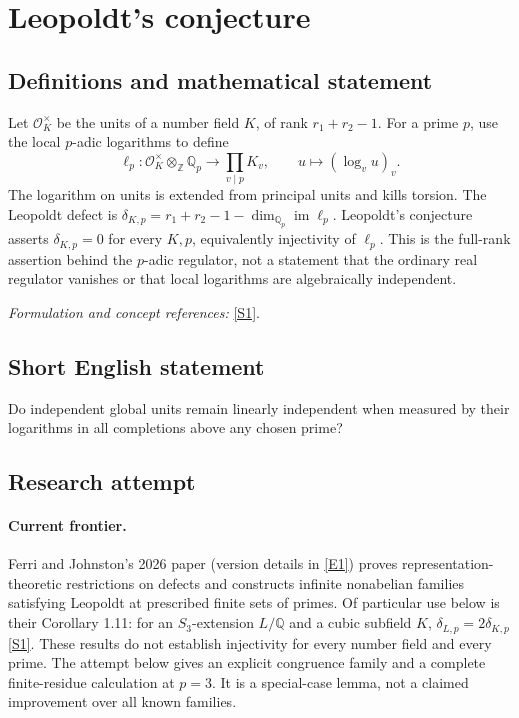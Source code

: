 \documentclass[11pt,a4paper]{article}
\newcommand{\Z}{\mathbb{Z}}
\newcommand{\Q}{\mathbb{Q}}
\newcommand{\sref}[2]{\hyperlink{source:#1:#2}{[S#2]}}
\newcommand{\eref}[2]{\hyperlink{extra:#1:#2}{[E#2]}}
\newif\ifshowcatalogue
\newcommand{\cataloguescope}[1]{\ifshowcatalogue
 \paragraph{Exact scope in the supplied catalogue.}
 \begin{quote}\small #1\end{quote}\fi}
\numberwithin{equation}{section}
\begin{document}
\setcounter{section}{155}
\clearpage
\section{\texorpdfstring{Leopoldt's conjecture}{Leopoldt's conjecture}}\label{156}
\subsection{Definitions and mathematical statement}
Let $\mathcal O_K^\times$ be the units of a number field $K$, of rank $r_1+r_2-1$. For a prime $p$, use the local $p$-adic logarithms to define
\[
 \ell_p:\mathcal O_K^\times\otimes_{\Z}\Q_p\longrightarrow\prod_{v\mid p}K_v,
 \qquad u\longmapsto(\log_v u)_v.
\]
The logarithm on units is extended from principal units and kills torsion. The Leopoldt defect is
$\delta_{K,p}=r_1+r_2-1-\dim_{\Q_p}\operatorname{im}\ell_p$.
Leopoldt's conjecture asserts $\delta_{K,p}=0$ for every $K,p$, equivalently injectivity of $\ell_p$. This is the full-rank assertion behind the $p$-adic regulator, not a statement that the ordinary real regulator vanishes or that local logarithms are algebraically independent.
\par\smallskip\textit{Formulation and concept references:} \sref{156}{1}.
\cataloguescope{Prove or disprove that for every number field K and every prime p, the Leopoldt defect of K at p is zero, equivalently that the p-adic regulator has the conjectured full rank.}
\subsection{Short English statement}
Do independent global units remain linearly independent when measured by their logarithms in all completions above any chosen prime?
\subsection{Research attempt}

\paragraph{Current frontier.}
Ferri and Johnston's 2026 paper (version details in \eref{156}{1}) proves representation-theoretic restrictions
on defects and constructs infinite nonabelian families satisfying Leopoldt
at prescribed finite sets of primes. Of particular use below is their
Corollary 1.11: for an $S_3$-extension $L/\Q$ and a cubic subfield $K$,
$\delta_{L,p}=2\delta_{K,p}$ \sref{156}{1}. These results do not establish
injectivity for every number field and every prime. The attempt below gives
an explicit congruence family and a complete finite-residue calculation at
$p=3$. It is a special-case lemma, not a claimed improvement over all known
families.
\end{document}

